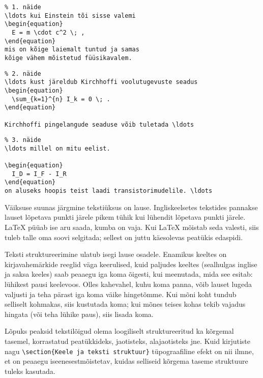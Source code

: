 \begin{code}
\begin{verbatim}
% 1. näide
\ldots kui Einstein tõi sisse valemi
\begin{equation}
  E = m \cdot c^2 \; ,
\end{equation}
mis on kõige laiemalt tuntud ja samas
kõige vähem mõistetud füüsikavalem.
\end{verbatim}
\end{code}

\begin{code}
\begin{verbatim}
% 2. näide
\ldots kust järeldub Kirchhoffi voolutugevuste seadus
\begin{equation}
  \sum_{k=1}^{n} I_k = 0 \; .
\end{equation}

Kirchhoffi pingelangude seaduse võib tuletada \ldots
\end{verbatim}
\end{code}

\begin{code}
\begin{verbatim}
% 3. näide
\ldots millel on mitu eelist.

\begin{equation}
  I_D = I_F - I_R
\end{equation}
on aluseks hoopis teist laadi transistorimudelile. \ldots
\end{verbatim}
\end{code}

Väiksuse suunas järgmine tekstiüksus on lause. Ingliskeelsetes tekstides
pannakse lauset lõpetava punkti järele pikem tühik kui lühendit lõpetava
punkti järele. \LaTeX{} püüab ise aru saada, kumba on vaja. Kui \LaTeX{}
mõistab seda valesti, siis tuleb talle oma soovi selgitada; sellest on
juttu käesolevas peatükis edaspidi.

Teksti struktureerimine ulatub isegi lause osadele. Enamikus keeltes on
kirjavahemärkide reeglid väga keerulised, kuid paljudes keeltes
(sealhulgas inglise ja saksa keeles) saab peaaegu iga koma õigesti, kui
meenutada, mida see esitab: lühikest pausi keelevoos. Olles kahevahel,
kuhu koma panna, võib lauset lugeda valjusti ja teha pärast iga koma
väike hingetõmme. Kui mõni koht tundub selliselt kohmakas, siis
kustutada koma; kui mõnes teises kohas tekib vajadus hingata (või teha
lühike paus), siis lisada koma.\enlargethispage{\baselineskip}

Lõpuks peaksid tekstilõigud olema loogiliselt struktureeritud ka
kõrgemal tasemel, korrastatud peatükkideks, jaotisteks, alajaotisteks
jne. Kuid kirjutiste nagu \verb|\section{|\texttt{Keele ja teksti
struktuur}\verb|}| tüpograafiline efekt on nii ilmne, et on peaaegu
iseenesestmõistetav, kuidas selliseid kõrgema taseme struktuure tuleks
kasutada.

